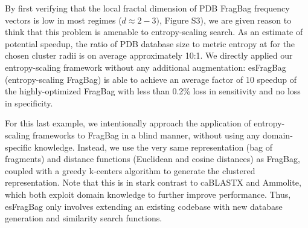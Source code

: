 \documentclass[review,preprint,12pt]{elsarticle}
\theoremstyle{definition}
\theoremstyle{remark}
\numberwithin{equation}{section}
\begin{document}
By first verifying that the local fractal dimension of PDB FragBag frequency vectors is low in most regimes ($d \approx 2-3)$, Figure S3), we are given reason to think that this problem is amenable to entropy-scaling search.
As an estimate of potential speedup, the ratio of PDB database size to metric 
entropy at for the chosen cluster radii is on average approximately 10:1.
We directly applied our entropy-scaling framework without any additional 
augmentation: esFragBag (entropy-scaling FragBag) is able to achieve an average
factor of 10 speedup of the highly-optimized FragBag with less than 0.2\% loss 
in sensitivity and no loss in specificity.

For this last example, we intentionally approach the application of entropy-scaling frameworks to FragBag in a blind manner,
without using any domain-specific knowledge.
Instead, we use the very same representation (bag of fragments) and distance functions (Euclidean and cosine distances)
as FragBag, coupled with a greedy k-centers algorithm to generate the clustered representation.
Note that this is in stark contrast to caBLASTX and Ammolite, which both exploit domain knowledge to further improve performance.
Thus, esFragBag only involves extending an existing codebase with new database generation and similarity search functions.
\end{document}
